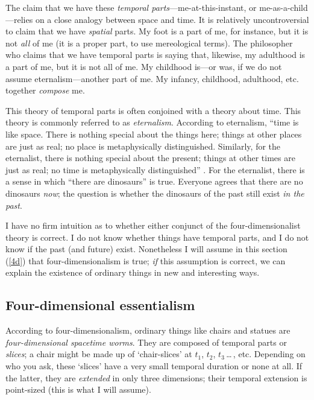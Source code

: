 \documentclass[11pt]{article}
\begin{document}
\begin{spacing}{1.5}
The claim that we have these {\em temporal
  parts}---me-at-this-instant, or me-as-a-child---relies on a close
analogy between space and time.  It is relatively uncontroversial to
claim that we have {\em spatial} parts.  My foot is a part of me, for
instance, but it is not {\em all} of me (it is a proper part, to use
mereological terms).  The philosopher who claims that we have temporal
parts is saying that, likewise, my adulthood is a part of me, but it
is not all of me.  My childhood is---or was, if we do not assume
eternalism---another part of me.  My infancy, childhood, adulthood,
etc. together {\em compose} me.

This theory of temporal parts is often conjoined with a theory about
time.  This theory is commonly referred to as {\em eternalism}.
According to eternalism, ``time is like space.  There is nothing
special about the things here; things at other places are just as
real; no place is metaphysically distinguished.  Similarly, for the
eternalist, there is nothing special about the present; things at
other times are just as real; no time is metaphysically
distinguished'' \citep[122]{hinchliff1996}.  For the eternalist, there
is a sense in which ``there are dinosaurs'' is true.  Everyone agrees
that there are no dinosaurs {\em now}; the question is whether the
dinosaurs of the past still exist {\em in the past}.  

I have no firm intuition as to whether either conjunct of the
four-dimensionalist theory is correct.  I do not know whether things
have temporal parts, and I do not know if the past (and future) exist.
Nonetheless I will assume in this section (\ref{4d}) that
four-dimensionalism is true; {\em if} this assumption is correct, we
can explain the existence of ordinary things in new and interesting
ways.

\subsection{Four-dimensional essentialism}
\label{4de}
According to four-dimensionalism, ordinary things like chairs and
statues are {\em four-dimensional spacetime worms}.  They are composed
of temporal parts or {\em slices}; a chair might be made up of
`chair-slices' at $t_{1}$, $t_{2}$, $t_{3}$\,\ldots\,, etc.  Depending
on who you ask, these `slices' have a very small temporal duration or
none at all.  If the latter, they are {\em extended} in only three
dimensions; their temporal extension is point-sized (this is what I
will assume).


\end{spacing}
\end{document}
